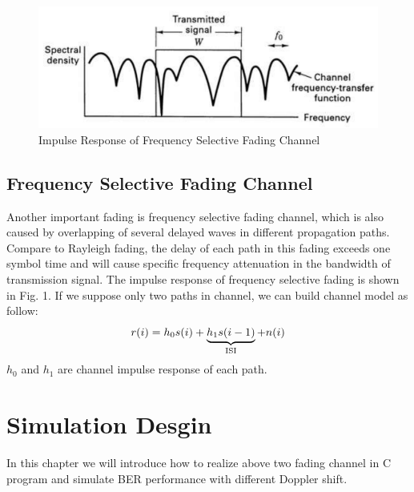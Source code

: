 \documentclass[technicalreport]{ieicej}
\begin{document}
\begin{figure}[H]
	\begin{center}
		\vspace{0cm}
		\includegraphics[width=\linewidth,clip]{fig/select_fading_illustrate.pdf}
		\caption{Impulse Response of Frequency Selective Fading Channel}
		\label{fig:sample}
	\end{center}
\end{figure}

\subsection{Frequency Selective Fading Channel}
Another important fading is frequency selective fading channel, which is also caused by overlapping of several delayed waves in different propagation paths. Compare to Rayleigh fading, the delay of each path in this fading exceeds one symbol time and will cause specific frequency attenuation in the bandwidth of transmission signal. The impulse response of frequency selective fading is shown in Fig. 1. If we suppose only two paths in channel, we can build channel model as follow:
\begin{equation}
r(i)=h_0s(i)+\underbrace{h_1s(i-1)}_{\rm ISI}+n(i)
\end{equation}
$h_0$ and $h_1$ are channel impulse response of each path.

\section{Simulation Desgin}
In this chapter we will introduce how to realize above two fading channel in C program and simulate BER performance with different Doppler shift.
\end{document}
